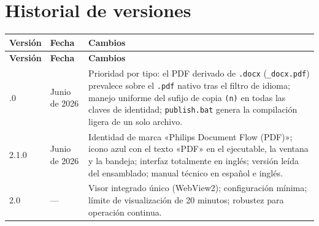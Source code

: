 \documentclass[11pt,a4paper]{article}
\begin{document}
\section{Historial de versiones}
\begin{xltabular}{\textwidth}{@{} p{1.8cm} p{2.6cm} L @{}}
\toprule
\textbf{Versión} & \textbf{Fecha} & \textbf{Cambios} \\
\midrule
\endfirsthead
\toprule
\textbf{Versión} & \textbf{Fecha} & \textbf{Cambios} \\
\midrule
\endhead
\bottomrule
{}.0 & Junio de 2026 & Prioridad por tipo: el PDF derivado de \texttt{.docx} (\texttt{\_docx.pdf}) prevalece sobre el \texttt{.pdf} nativo tras el filtro de idioma; manejo uniforme del sufijo de copia \texttt{(n)} en todas las claves de identidad; \texttt{publish.bat} genera la compilación ligera de un solo archivo. \\
2.1.0 & Junio de 2026 & Identidad de marca «Philips Document Flow (PDF)»; icono azul con el texto «PDF» en el ejecutable, la ventana y la bandeja; interfaz totalmente en inglés; versión leída del ensamblado; manual técnico en español e inglés. \\
2.0 & --- & Visor integrado único (WebView2); configuración mínima; límite de visualización de 20 minutos; robustez para operación continua. \\
\bottomrule
\end{xltabular}
\end{document}
